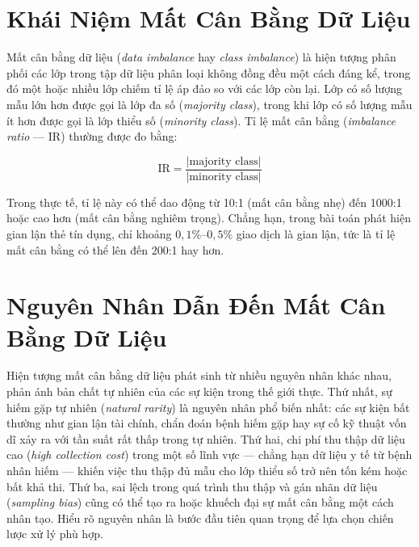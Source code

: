 \section{Khái Niệm Mất Cân Bằng Dữ Liệu}

Mất cân bằng dữ liệu (\textit{data imbalance} hay \textit{class imbalance}) là hiện tượng phân phối các lớp trong tập dữ liệu phân loại không đồng đều một cách đáng kể, trong đó một hoặc nhiều lớp chiếm tỉ lệ áp đảo so với các lớp còn lại. Lớp có số lượng mẫu lớn hơn được gọi là lớp đa số (\textit{majority class}), trong khi lớp có số lượng mẫu ít hơn được gọi là lớp thiểu số (\textit{minority class}). Tỉ lệ mất cân bằng (\textit{imbalance ratio} --- IR) thường được đo bằng:

\begin{equation}
  \text{IR} = \frac{|\text{majority class}|}{|\text{minority class}|}
  \label{eq:ir}
\end{equation}

Trong thực tế, tỉ lệ này có thể dao động từ 10:1 (mất cân bằng nhẹ) đến 1000:1 hoặc cao hơn (mất cân bằng nghiêm trọng). Chẳng hạn, trong bài toán phát hiện gian lận thẻ tín dụng, chỉ khoảng $0{,}1\%$--$0{,}5\%$ giao dịch là gian lận, tức là tỉ lệ mất cân bằng có thể lên đến 200:1 hay hơn.

\section{Nguyên Nhân Dẫn Đến Mất Cân Bằng Dữ Liệu}

Hiện tượng mất cân bằng dữ liệu phát sinh từ nhiều nguyên nhân khác nhau, phản ánh bản chất tự nhiên của các sự kiện trong thế giới thực. Thứ nhất, sự hiếm gặp tự nhiên (\textit{natural rarity}) là nguyên nhân phổ biến nhất: các sự kiện bất thường như gian lận tài chính, chẩn đoán bệnh hiếm gặp hay sự cố kỹ thuật vốn dĩ xảy ra với tần suất rất thấp trong tự nhiên. Thứ hai, chi phí thu thập dữ liệu cao (\textit{high collection cost}) trong một số lĩnh vực --- chẳng hạn dữ liệu y tế từ bệnh nhân hiếm --- khiến việc thu thập đủ mẫu cho lớp thiểu số trở nên tốn kém hoặc bất khả thi. Thứ ba, sai lệch trong quá trình thu thập và gán nhãn dữ liệu (\textit{sampling bias}) cũng có thể tạo ra hoặc khuếch đại sự mất cân bằng một cách nhân tạo. Hiểu rõ nguyên nhân là bước đầu tiên quan trọng để lựa chọn chiến lược xử lý phù hợp.

